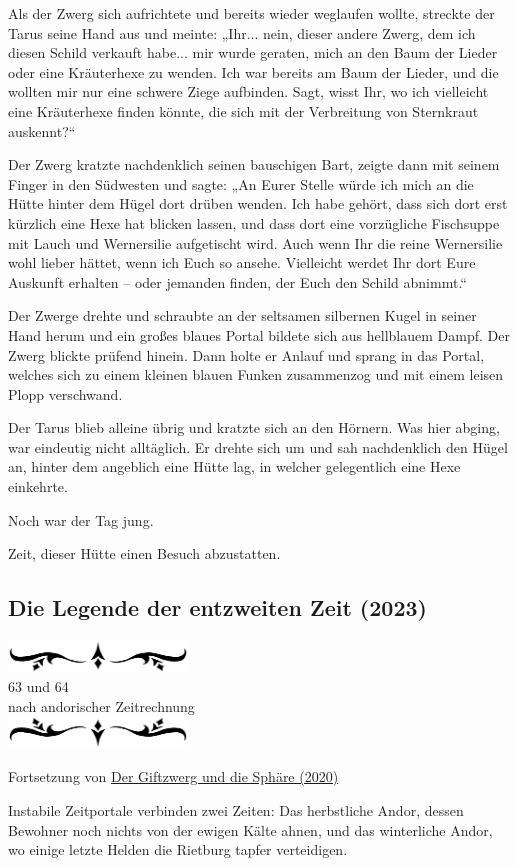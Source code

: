 \documentclass[10pt, a4paper, oneside]{book}
\newcommand{\hypref}[1]{%
    \hyperref[#1]{#1}%
}
\newcommand{\az}[1]{%
    \begin{center}
        \includegraphics[width=180px]{Das Erbe des Wunderkindes/verzierung1.png}\\
        {\Huge #1} \\
        {nach andorischer Zeitrechnung}\\
        \includegraphics[width=180px]{Das Erbe des Wunderkindes/verzierung2.png}
    \end{center}
    \extramarks{}{#1 a.Z.}
}
\begin{document}
Als der Zwerg sich aufrichtete und bereits wieder weglaufen wollte, streckte der Tarus seine Hand aus und meinte: „Ihr... nein, dieser andere Zwerg, dem ich diesen Schild verkauft habe... mir wurde geraten, mich an den Baum der Lieder oder eine Kräuterhexe zu wenden. Ich war bereits am Baum der Lieder, und die wollten mir nur eine schwere Ziege aufbinden. Sagt, wisst Ihr, wo ich vielleicht eine Kräuterhexe finden könnte, die sich mit der Verbreitung von Sternkraut auskennt?“

Der Zwerg kratzte nachdenklich seinen bauschigen Bart, zeigte dann mit seinem Finger in den Südwesten und sagte: „An Eurer Stelle würde ich mich an die Hütte hinter dem Hügel dort drüben wenden. Ich habe gehört, dass sich dort erst kürzlich eine Hexe hat blicken lassen, und dass dort eine vorzügliche Fischsuppe mit Lauch und Wernersilie aufgetischt wird. Auch wenn Ihr die reine Wernersilie wohl lieber hättet, wenn ich Euch so ansehe. Vielleicht werdet Ihr dort Eure Auskunft erhalten – oder jemanden finden, der Euch den Schild abnimmt.“

Der Zwerge drehte und schraubte an der seltsamen silbernen Kugel in seiner Hand herum und ein großes blaues Portal bildete sich aus hellblauem Dampf. Der Zwerg blickte prüfend hinein. Dann holte er Anlauf und sprang in das Portal, welches sich zu einem kleinen blauen Funken zusammenzog und mit einem leisen Plopp verschwand.

Der Tarus blieb alleine übrig und kratzte sich an den Hörnern. Was hier abging, war eindeutig nicht alltäglich. Er drehte sich um und sah nachdenklich den Hügel an, hinter dem angeblich eine Hütte lag, in welcher gelegentlich eine Hexe einkehrte.

Noch war der Tag jung.

Zeit, dieser Hütte einen Besuch abzustatten.














\begin{chapterbox}
    \chapter{Die Legende der entzweiten Zeit (2023)}
    \label{Die Legende der entzweiten Zeit (2023)}
    \az{63 und 64}

    \begin{center}
        Fortsetzung von \hypref{Der Giftzwerg und die Sphäre (2020)}
    \end{center}
    
    Instabile Zeitportale verbinden zwei Zeiten: Das herbstliche Andor, dessen Bewohner noch nichts von der ewigen Kälte ahnen, und das winterliche Andor, wo einige letzte Helden die Rietburg tapfer verteidigen.
\end{chapterbox}
\end{document}
